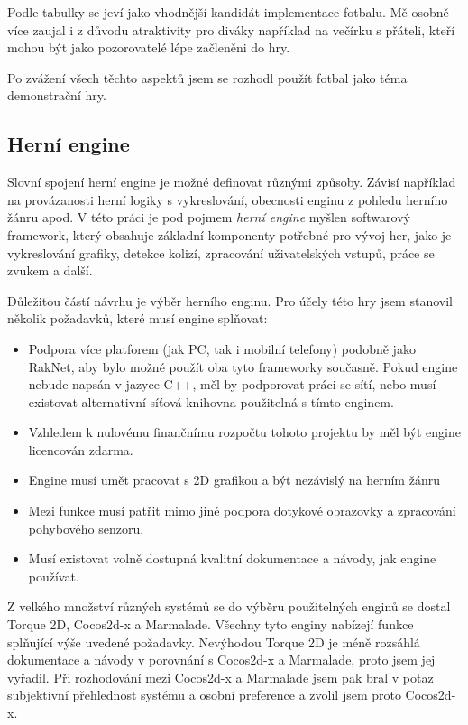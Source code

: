 \documentclass[thesis=B,czech,hidelinks]{FITthesis}[2012/06/26] %
\begin{document}
Podle tabulky se jeví jako vhodnější kandidát implementace fotbalu. Mě osobně více zaujal i z důvodu atraktivity pro diváky například na večírku s přáteli, kteří mohou být jako pozorovatelé lépe začleněni do hry. 

Po zvážení všech těchto aspektů jsem se rozhodl použít fotbal jako téma demonstrační hry.

\subsection{Herní engine}

Slovní spojení herní engine je možné definovat různými způsoby. Závisí například na provázanosti herní logiky s vykreslování, obecnosti enginu z pohledu herního žánru apod. V této práci je pod pojmem \textit{herní engine} myšlen softwarový framework, který obsahuje základní komponenty potřebné pro vývoj her, jako je vykreslování grafiky, detekce kolizí, zpracování uživatelských vstupů, práce se zvukem a další. \cite{gameengine}

Důležitou částí návrhu je výběr herního enginu. Pro účely této hry jsem stanovil několik požadavků, které musí engine splňovat:

\begin{itemize}
	\item Podpora více platforem (jak PC, tak i mobilní telefony) podobně jako RakNet, aby bylo možné použít oba tyto frameworky současně. Pokud engine nebude napsán v jazyce C++, měl by podporovat práci se sítí, nebo musí existovat alternativní síťová knihovna použitelná s tímto enginem.
	\item Vzhledem k nulovému finančnímu rozpočtu tohoto projektu by měl být engine licencován zdarma.
	\item Engine musí umět pracovat s 2D grafikou a být nezávislý na herním žánru
	\item Mezi funkce musí patřit mimo jiné podpora dotykové obrazovky a zpracování pohybového senzoru.
	\item Musí existovat volně dostupná kvalitní dokumentace a návody, jak engine používat.
\end{itemize}

Z velkého množství různých systémů se do výběru použitelných enginů se dostal Torque 2D, Cocos2d-x a Marmalade. Všechny tyto enginy nabízejí funkce splňující výše uvedené požadavky. Nevýhodou Torque 2D je méně rozsáhlá dokumentace a návody v porovnání s Cocos2d-x a Marmalade, proto jsem jej vyřadil. Při rozhodování mezi Cocos2d-x a Marmalade jsem pak bral v potaz subjektivní přehlednost systému a osobní preference a zvolil jsem proto Cocos2d-x.
\end{document}
